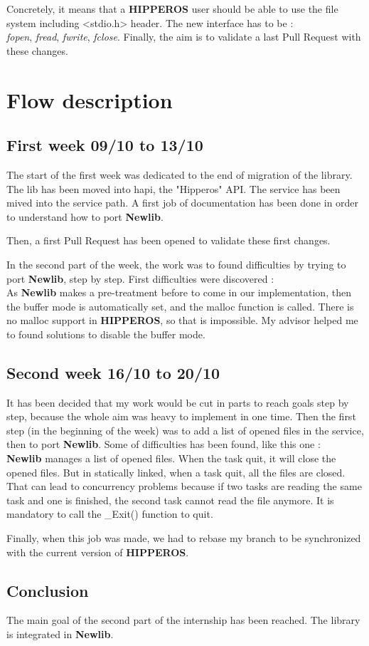 \documentclass[12pt]{article}
\begin{document}
Concretely, it means that a \textbf{HIPPEROS} user should be able to use 
the file system including <stdio.h> header. The new interface has to be :\\
\textit{fopen}, \textit{fread}, \textit{fwrite}, \textit{fclose}.
Finally, the aim is to validate a last Pull Request with these changes.

\section{Flow description}
\subsection{First week 09/10 to 13/10}
The start of the first week was dedicated to the end of migration of the 
library. The lib has been moved into hapi, the "Hipperos" API.
The service has been mived into the service path. 
A first job of documentation has been done in order to understand how to 
port \textbf{Newlib}. 

Then, a first Pull Request has been opened to validate these first changes.

In the second part of the week, the work was to found difficulties by trying to 
port \textbf{Newlib}, step by step. First difficulties were discovered :\\
As \textbf{Newlib} makes a pre-treatment before to come in our implementation, 
then the buffer mode is automatically set, and the malloc function is called. 
There is no malloc support in \textbf{HIPPEROS}, so that is impossible. 
My advisor helped me to found solutions to disable the buffer mode.

\subsection{Second week 16/10 to 20/10}
It has been decided that my work would be cut in parts to reach goals 
step by step, because the whole aim was heavy to implement in one time.
Then the first step (in the beginning of the week) was to add a list 
of opened files in the service, then to port \textbf{Newlib}.
Some of difficulties has been found, like this one :\\
\textbf{Newlib} manages a list of opened files. When the task quit, it will 
close the opened files. But in statically linked, when a task quit, 
all the files are closed. That can lead to concurrency problems because
if two tasks are reading the same task and one is finished, the second 
task cannot read the file anymore. It is mandatory to call the \_Exit() 
function to quit. 

Finally, when this job was made, we had to rebase my 
branch to be synchronized with the current version of \textbf{HIPPEROS}.

\subsection{Conclusion}
The main goal of the second part of the internship has been reached. 
The library is integrated in \textbf{Newlib}. 
\end{document}
